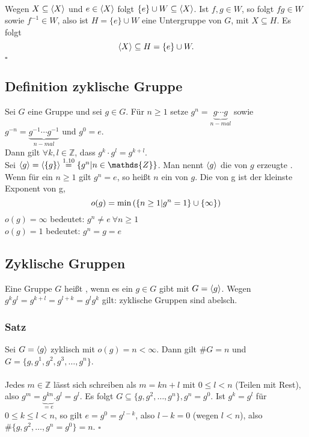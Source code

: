 \\
Wegen $X\subseteq \langle X \rangle$ und $e\in \langle X \rangle$ folgt $\{e\}\cup W\subseteq \langle X \rangle$. 
Ist $f,g\in W$, so folgt $fg\in W$ sowie $f^{-1}\in W$, also ist $H=\{e\}\cup W$ eine Untergruppe von $G$, mit $X\subseteq H$. 
Es folgt 
\[
\langle X \rangle\subseteq H=\{e\}\cup W.
\]
\hfill $\square$

\subsection{Definition zyklische Gruppe}
\label{sub:def_zyklische_gruppen}
Sei $G$ eine Gruppe und sei $g\in G$. 
Für $n\ge 1$ setze $g^n=\underbrace{g\cdots g}_{n-mal}$ sowie $g^{-n}=\underbrace{g^{-1}\cdots g^{-1}}_{n-mal}$ und $g^0=e$.\\
Dann gilt $\forall k,l\in \mathds{Z}$, dass $g^k\cdot g^l = g^{k+l}$.\\
Sei $\lh{g}=\lh{\{g\}}\stackrel{1.10}{=}\{g^n | n\in \mathds{Z}\}$. 
Man nennt $\langle g \rangle$ die von $g$ erzeugte . 
Wenn für ein $n\ge 1$ gilt $g^n=e$, so heißt $n$ ein  von $g$. 
Die  von g ist der kleinste Exponent von g,
\[
o(g)=\min\left( \{n\ge 1 | g^n=1\}\cup \{\infty\}\right)
\]
$o(g)=\infty$ bedeutet: $g^n\not= e~\forall n\ge 1$\\
$o(g)=1$ bedeutet: $g^n=g=e$

\subsection{Zyklische Gruppen}
\label{sub:zyklische_gruppen}
Eine Gruppe $G$ heißt , wenn es ein $g\in G$ gibt mit $G=\langle g \rangle$. 
Wegen $g^kg^l=g^{k+l}=g^{l+k}=g^lg^k$ gilt: zyklische Gruppen sind abelsch.

\subsubsection*{Satz}
Sei $G=\langle g \rangle$ zyklisch mit $o(g)=n<\infty$. 
Dann gilt $\#G=n$ und $G=\{g,g^1,g^2,g^3,\dots,g^n\}$.\\

\\
Jedes $m\in \mathds{Z}$ lässt sich schreiben als $m=kn+l$ mit $0\le l<n$ (Teilen mit Rest), also $g^m= \underbrace{g^{kn}}_{=e}.g^l=g^l$. 
Es folgt $G\subseteq \{g,g^2,\dots,g^n\}, g^n=g^0$.
Ist $g^k=g^l$ für $0\le k\le l<n$, so gilt $e=g^0=g^{l-k}$, also $l-k=0$ (wegen $l<n$), also $\#\{g,g^2,\dots,g^n=g^0\}=n$.
\hfill $\square$

